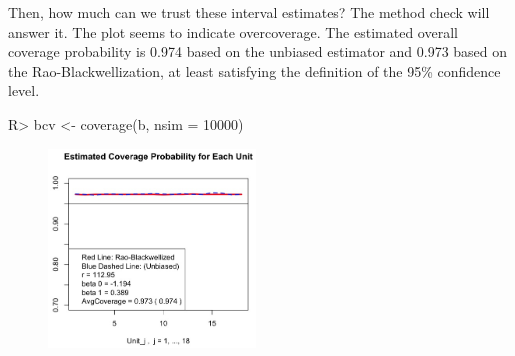 \documentclass[article]{jss}
\begin{document}
Then, how much can we trust these interval estimates? The method check will answer it. The plot seems to indicate overcoverage. The estimated overall coverage probability is 0.974 based on the unbiased estimator and 0.973 based on the Rao-Blackwellization, at least satisfying the definition of the 95\% confidence level. 
\begin{CodeChunk}
\begin{CodeInput}
R> bcv <- coverage(b, nsim = 10000)
\end{CodeInput}
\end{CodeChunk}
\begin{figure}[h]
\begin{center}
\includegraphics[width = 5.5cm]{baseball2.png}
\end{center}
\end{figure}
\end{document}
